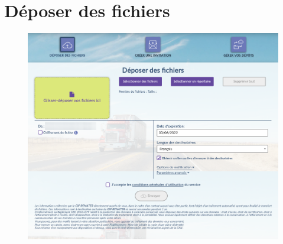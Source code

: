 \section{Déposer des fichiers}

\begin{figure}
	\centering
	\includegraphics{./Captures/filesender.envoi.fichier.png}
\end{figure}
